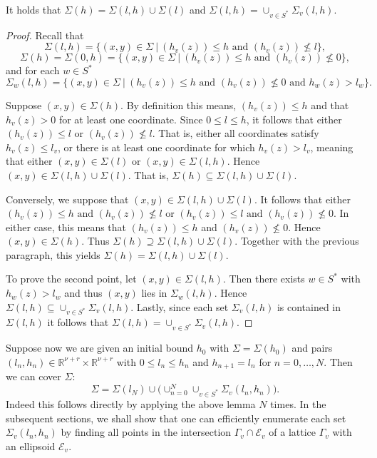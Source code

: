 \begin{lemma}\label{lem:covering}
It holds that $\Sigma(h)=\Sigma(l,h)\cup \Sigma(l)$ and $\Sigma(l,h)=\cup_{v\in S^*}\Sigma_v(l,h)$.
\end{lemma}
\begin{proof}
Recall that 
\[\Sigma(l,h) = \{(x,y) \in \Sigma \ | \ (h_v(z))\leq h \text{ and } (h_v(z))\nleq l\},\]
\[\Sigma(h) = \Sigma(0,h)= \{(x,y) \in \Sigma \ | \ (h_v(z))\leq h \text{ and }  (h_v(z))\nleq 0 \},\]
and for each $w\in S^*$
\[\Sigma_w(l,h) = \{(x,y) \in \Sigma \ | \ (h_v(z))\leq h \text{ and }  (h_v(z))\nleq 0 \text{ and } h_w(z)>l_w\}.\]

Suppose $(x,y) \in \Sigma(h)$. By definition this means, $(h_v(z))\leq h$ and that $h_v(z) > 0$ for at least one coordinate. Since $0 \leq l \leq h$, it follows that either $(h_v(z))\leq l$ or $(h_v(z))\nleq l$. That is, either all coordinates satisfy $h_v(z) \leq l_v$, or there is at least one coordinate for which $h_v(z) > l_v$, meaning that either $(x,y) \in \Sigma(l)$ or $(x,y) \in \Sigma(l,h)$. Hence $(x,y) \in \Sigma(l,h) \cup \Sigma(l)$. That is, $\Sigma(h) \subseteq \Sigma(l,h) \cup \Sigma(l)$.

Conversely, we suppose that $(x,y) \in \Sigma(l,h) \cup \Sigma(l)$. It follows that either $(h_v(z))\leq h \text{ and } (h_v(z))\nleq l$ or $(h_v(z))\leq l \text{ and } (h_v(z))\nleq 0$. In either case, this means that $(h_v(z)) \leq h$ and $(h_v(z)) \nleq 0$. Hence $(x,y) \in \Sigma(h)$. Thus $\Sigma(h) \supseteq \Sigma(l,h) \cup \Sigma(l)$. Together with the previous paragraph, this yields $\Sigma(h)=\Sigma(l,h)\cup \Sigma(l)$.

To prove the second point, let $(x,y) \in \Sigma(l,h)$. Then there exists $w\in S^*$ with $h_w(z)>l_w$ and thus $(x,y)$ lies in $\Sigma_w(l,h)$. Hence $\Sigma(l,h) \subseteq \cup_{v\in S^*}\Sigma_v(l,h)$. Lastly, since each set $\Sigma_v(l,h)$ is contained in $\Sigma(l,h)$ it follows that $\Sigma(l,h)=\cup_{v\in S^*}\Sigma_v(l,h)$.
\end{proof}

Suppose now we are given an initial bound $h_0$ with $\Sigma=\Sigma(h_0)$ and pairs $(l_n,h_n)\in \mathbb{R}^{\nu + r}\times \mathbb{R}^{\nu + r}$ with $0\leq l_n\leq h_n$ and $h_{n+1}=l_{n}$ for $n=0,\dotsc,N$. Then we can cover $\Sigma$: $$\Sigma=\Sigma(l_{N})\cup\bigl(\cup_{n=0}^{N}\cup_{v\in S^*}\Sigma_v(l_n,h_n)\bigl).$$
Indeed this follows directly by applying the above lemma $N$ times. In the subsequent sections, we shall show that one can efficiently enumerate each set $\Sigma_v(l_n,h_n)$ by finding all points in the intersection $\Gamma_v\cap \mathcal E_v$ of a lattice $\Gamma_v$ with an ellipsoid $\mathcal E_v$.





